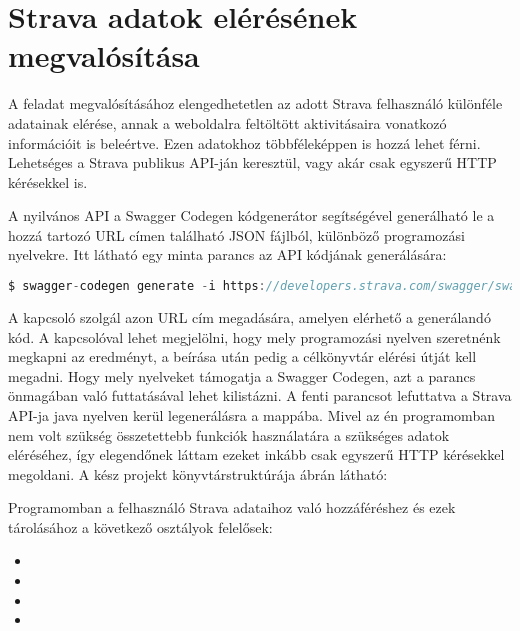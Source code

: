 \section{Strava adatok elérésének megvalósítása}

A feladat megvalósításához elengedhetetlen az adott Strava felhasználó különféle adatainak elérése, annak a weboldalra feltöltött aktivitásaira vonatkozó információit is beleértve.
Ezen adatokhoz többféleképpen is hozzá lehet férni.
Lehetséges a Strava publikus API-ján keresztül, vagy akár csak egyszerű HTTP kérésekkel is. 

A nyilvános API a Swagger Codegen kódgenerátor segítségével generálható le a hozzá tartozó URL címen található JSON fájlból, különböző programozási nyelvekre.\cite{strava}
Itt látható egy minta parancs az API kódjának generálására: 

\begin{lstlisting}[language=Java]
$ swagger-codegen generate -i https://developers.strava.com/swagger/swagger.json -l java -o generated/java 
\end{lstlisting}

A  kapcsoló szolgál azon URL cím megadására, amelyen elérhető a generálandó kód.
A  kapcsolóval lehet megjelölni, hogy mely programozási nyelven szeretnénk megkapni az eredményt, a  beírása után pedig a célkönyvtár elérési útját kell megadni.
Hogy mely nyelveket támogatja a Swagger Codegen, azt a  parancs önmagában való futtatásával lehet kilistázni.
A fenti parancsot lefuttatva a Strava API-ja java nyelven kerül legenerálásra a  mappába.
Mivel az én programomban nem volt szükség összetettebb funkciók használatára a szükséges adatok eléréséhez, így elegendőnek láttam ezeket inkább csak egyszerű HTTP kérésekkel megoldani.
A kész projekt könyvtárstruktúrája  ábrán látható: 



Programomban a felhasználó Strava adataihoz való hozzáféréshez és ezek tárolásához a következő osztályok felelősek: 

\begin{itemize}
\setlength\itemsep{0em}
\item {}
\item {}
\item {}
\item {}
\end{itemize}
 

